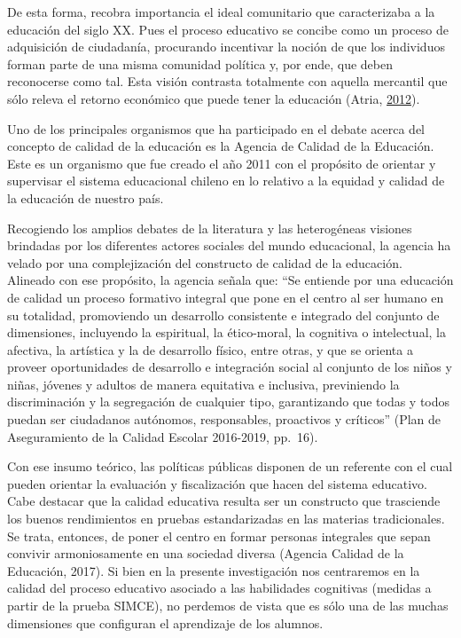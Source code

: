 \documentclass[
]{article}
\begin{document}
De esta forma, recobra importancia el ideal comunitario que
caracterizaba a la educación del siglo XX. Pues el proceso educativo se
concibe como un proceso de adquisición de ciudadanía, procurando
incentivar la noción de que los individuos forman parte de una misma
comunidad política y, por ende, que deben reconocerse como tal. Esta
visión contrasta totalmente con aquella mercantil que sólo releva el
retorno económico que puede tener la educación (Atria,
\protect\hyperlink{ref-atria_mala_2012}{2012}).

Uno de los principales organismos que ha participado en el debate acerca
del concepto de calidad de la educación es la Agencia de Calidad de la
Educación. Este es un organismo que fue creado el año 2011 con el
propósito de orientar y supervisar el sistema educacional chileno en lo
relativo a la equidad y calidad de la educación de nuestro país.

Recogiendo los amplios debates de la literatura y las heterogéneas
visiones brindadas por los diferentes actores sociales del mundo
educacional, la agencia ha velado por una complejización del constructo
de calidad de la educación. Alineado con ese propósito, la agencia
señala que: ``Se entiende por una educación de calidad un proceso
formativo integral que pone en el centro al ser humano en su totalidad,
promoviendo un desarrollo consistente e integrado del conjunto de
dimensiones, incluyendo la espiritual, la ético-moral, la cognitiva o
intelectual, la afectiva, la artística y la de desarrollo físico, entre
otras, y que se orienta a proveer oportunidades de desarrollo e
integración social al conjunto de los niños y niñas, jóvenes y adultos
de manera equitativa e inclusiva, previniendo la discriminación y la
segregación de cualquier tipo, garantizando que todas y todos puedan ser
ciudadanos autónomos, responsables, proactivos y críticos'' (Plan de
Aseguramiento de la Calidad Escolar 2016-2019, pp.~16).

Con ese insumo teórico, las políticas públicas disponen de un referente
con el cual pueden orientar la evaluación y fiscalización que hacen del
sistema educativo. Cabe destacar que la calidad educativa resulta ser un
constructo que trasciende los buenos rendimientos en pruebas
estandarizadas en las materias tradicionales. Se trata, entonces, de
poner el centro en formar personas integrales que sepan convivir
armoniosamente en una sociedad diversa (Agencia Calidad de la Educación,
2017). Si bien en la presente investigación nos centraremos en la
calidad del proceso educativo asociado a las habilidades cognitivas
(medidas a partir de la prueba SIMCE), no perdemos de vista que es sólo
una de las muchas dimensiones que configuran el aprendizaje de los
alumnos.
\end{document}
